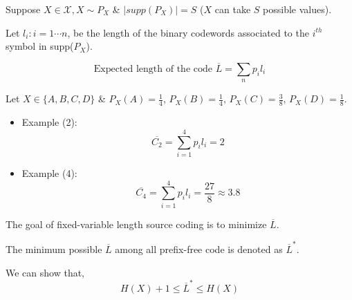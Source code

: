 \documentclass{article}
\begin{document}
\begin{enumerate}
Suppose $X \in \mathcal{X}, X \sim P_X$ \& $|supp(P_X)|= S$ ($X$ can take $S$ possible values).

Let $l_i : i= 1\cdots n$, be the length of the binary codewords associated to the $i^{th}$ symbol in supp($P_X$).

$$ \text{Expected length of the code } \overline{L}= \sum_{n} p_i l_i$$

Let $X \in \{ A,B,C,D\} $ \& $P_X(A)= \frac{1}{4},\, P_X(B)= \frac{1}{4},\, P_X(C)= \frac{3}{8},\, P_X(D)= \frac{1}{8}$.
\begin{itemize}
    \item Example (2):
    $$ \overline{C_2}= \sum_{i=1}^{4} p_i l_i=2$$
    \item Example (4):
    $$ \overline{C_4}= \sum_{i=1}^{4} p_i l_i=\frac{27}{8} \approx 3.8$$
\end{itemize}
\end{enumerate}

The goal of fixed-variable length source coding is to minimize $\overline{L}$.

The minimum possible $\overline{L}$ among all prefix-free code is denoted as $\overline{L}^{*}$.

We can show that,
$$ H(X)+1 \leq \overline{L}^{*} \leq H(X)$$
\end{document}
